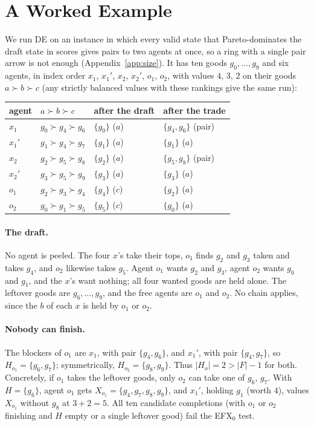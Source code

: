 \documentclass[runningheads,11pt]{llncs}
\newcommand{\efxz}{\texorpdfstring{\mbox{EFX$_0$}}{EFX0}}
\newcommand{\DE}{\textup{DE}}
\begin{document}
\section{A Worked Example}\label{sec:example}

We run \DE{} on an instance in which every valid state that Pareto-dominates the draft state in scores gives pairs to two agents at once, so a ring with a single pair arrow is not enough (Appendix~\ref{app:size}). It has ten goods $g_0,\dots,g_9$ and six agents, in index order $x_1$, $x_1'$, $x_2$, $x_2'$, $o_1$, $o_2$, with values $4$, $3$, $2$ on their goods $a\succ b\succ c$ (any strictly balanced values with these rankings give the same run):
\begin{center}
\setlength{\tabcolsep}{6pt}\begin{tabular}{@{}llll@{}}
\toprule
agent & $a\succ b\succ c$ & after the draft & after the trade \\
\midrule
$x_1$ & $g_0\succ g_4\succ g_6$ & $\{g_0\}$ ($a$) & $\{g_4,g_6\}$ (pair) \\
$x_1'$ & $g_1\succ g_4\succ g_7$ & $\{g_1\}$ ($a$) & $\{g_1\}$ ($a$) \\
$x_2$ & $g_2\succ g_5\succ g_8$ & $\{g_2\}$ ($a$) & $\{g_5,g_8\}$ (pair) \\
$x_2'$ & $g_3\succ g_5\succ g_9$ & $\{g_3\}$ ($a$) & $\{g_3\}$ ($a$) \\
$o_1$ & $g_2\succ g_3\succ g_4$ & $\{g_4\}$ ($c$) & $\{g_2\}$ ($a$) \\
$o_2$ & $g_0\succ g_1\succ g_5$ & $\{g_5\}$ ($c$) & $\{g_0\}$ ($a$) \\
\bottomrule
\end{tabular}
\end{center}

\paragraph{The draft.} No agent is peeled. The four $x$'s take their tops, $o_1$ finds $g_2$ and $g_3$ taken and takes $g_4$, and $o_2$ likewise takes $g_5$. Agent $o_1$ wants $g_2$ and $g_3$, agent $o_2$ wants $g_0$ and $g_1$, and the $x$'s want nothing; all four wanted goods are held alone. The leftover goods are $g_6,\dots,g_9$, and the free agents are $o_1$ and $o_2$. No chain applies, since the $b$ of each $x$ is held by $o_1$ or $o_2$.

\paragraph{Nobody can finish.} The blockers of $o_1$ are $x_1$, with pair $\{g_4,g_6\}$, and $x_1'$, with pair $\{g_4,g_7\}$, so $H_{o_1}=\{g_6,g_7\}$; symmetrically, $H_{o_2}=\{g_8,g_9\}$. Thus $|H_o|=2>|F|-1$ for both. Concretely, if $o_1$ takes the leftover goods, only $o_2$ can take one of $g_6$, $g_7$. With $H=\{g_6\}$, agent $o_1$ gets $X_{o_1}=\{g_4,g_7,g_8,g_9\}$, and $x_1'$, holding $g_1$ (worth $4$), values $X_{o_1}$ without $g_8$ at $3+2=5$. All ten candidate completions (with $o_1$ or $o_2$ finishing and $H$ empty or a single leftover good) fail the \efxz{} test.
\end{document}
